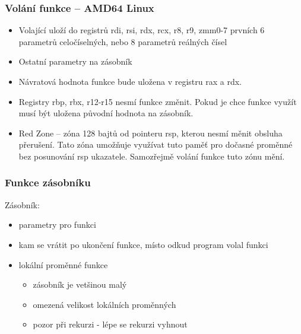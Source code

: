 \documentclass{beamer}
\begin{document}
\begin{frame}
\frametitle{Volání funkce -- AMD64 Linux}

\begin{itemize}
\item Volající uloží do registrů rdi, rsi, rdx, rcx, r8, r9, zmm0-7 prvních 6 parametrů celočíselných, nebo 8 parametrů reálných čísel
\item Ostatní parametry na zásobník
\end{itemize}

\bigskip

\begin{itemize}
\item Návratová hodnota funkce bude uložena v registru rax a rdx.
\item Registry rbp, rbx, r12-r15 nesmí funkce změnit. Pokud je chce funkce využít musí být uložena původní hodnota na zásobník.
\item Red Zone -- zóna 128 bajtů od pointeru rsp, kterou nesmí měnit obsluha přerušení. Tato zóna umožňuje využívat tuto paměť pro dočasné proměnné bez posunování rsp ukazatele.
Samozřejmě volání funkce tuto zónu mění.
\end{itemize}

\end{frame}



\begin{frame}
\frametitle{Funkce zásobníku}

Zásobník:
\begin{itemize}
  \item parametry pro funkci
  \item kam se vrátit po ukončení funkce, místo odkud program volal funkci
  \item lokální proměnné funkce
  \begin{itemize}
    \item zásobník je vetšinou malý
    \item omezená velikost lokálních proměnných
    \item pozor při rekurzi - lépe se rekurzi vyhnout
  \end{itemize}
\end{itemize}

\end{frame}
\end{document}
